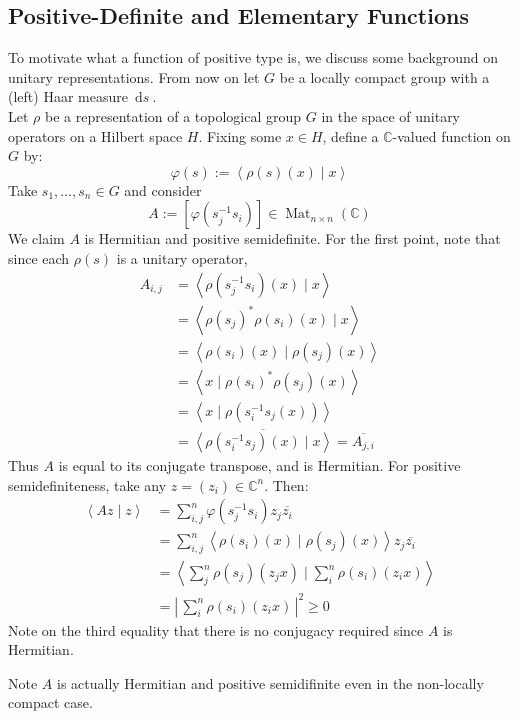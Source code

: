 \documentclass[11pt, x11names, openany]{book}
\newcommand{\cc}{\mathbb{C}}
\renewcommand{\bar}[1]{\overline{#1}}
\newcommand{\brangle}[1]{\left\langle #1 \right\rangle}
\newcommand{\abs}[1]{\left| \, #1  \,\right|}
\newcommand{\sqbrack}[1]{\left[ #1 \right]}
\newcommand{\inv}[1]{#1^{-1}}
\DeclareMathOperator{\mat}{Mat}
\newcommand{\ds}{\, \mathrm{d}s \ }
\begin{document}
\subsection{Positive-Definite and Elementary Functions}
\label{subsection: Pos-Def and Elementary Funcs}
To motivate what a function of positive type is, we discuss some background on unitary representations. From now on let $G$ be a locally compact group with a (left) Haar measure $\ds$.\\

Let $\rho$ be a representation of a topological group $G$ in the space of unitary operators on a Hilbert space $H$. Fixing some $x \in H$, define a $\cc$-valued function on $G$ by:
\begin{equation*}
    \varphi(s) := \brangle{\rho(s)(x) \mid x}
\end{equation*}
Take $s_1, \ldots, s_n \in G$ and consider
\begin{equation*}
    A := \sqbrack{\varphi(\inv{s_j}s_i)} \in \mat_{n \times n}(\cc)
\end{equation*}
We claim $A$ is Hermitian and positive semidefinite. For the first point, note that since each $\rho(s)$ is a unitary operator,
\begin{equation*}
\begin{split}
    A_{i, j} &= \brangle{\rho(\inv{s_j}s_i)(x) \mid x}\\ 
    &= \brangle{\rho(s_j)^* \rho(s_i)(x) \mid x}\\
    &= \brangle{\rho(s_i)(x) \mid \rho(s_j)(x)}\\
    &= \brangle{x \mid \rho(s_i)^* \rho(s_j)(x)}\\
    &= \brangle{x \mid \rho(\inv{s_i}s_j(x))}\\
    &= \bar{\brangle{\rho(\inv{s_i}s_j)(x) \mid x}} = \bar{A_{j, i}}
\end{split}
\end{equation*}
Thus $A$ is equal to its conjugate transpose, and is Hermitian. For positive semidefiniteness, take any $z = (z_i) \in \cc^n$. Then:
\begin{equation*}
    \begin{split}
        \brangle{Az \mid z} &= \sum^n_{i, j} \varphi(\inv{s_j}s_i)z_j \bar{z_i}\\
        &= \sum^n_{i, j} \brangle{\rho(s_i)(x) \mid \rho(s_j)(x)}z_j \bar{z_i}\\
        &= \brangle{\sum^n_{j} \rho(s_j)(z_j x) \mid \sum^n_{i} \rho(s_i)(z_ix)}\\
        &= \abs{\sum^n_i \rho(s_i)(z_i x)}^2 \geq 0
    \end{split}
\end{equation*}
Note on the third equality that there is no conjugacy required since $A$ is Hermitian.
\begin{remark}
    Note $A$ is actually Hermitian and positive semidifinite even in the non-locally compact case.
\end{remark}
\end{document}
